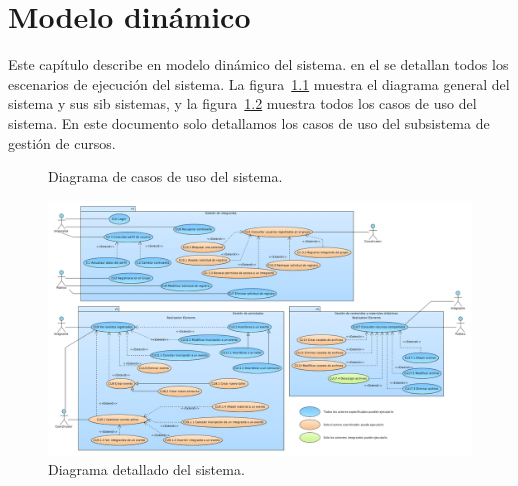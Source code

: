\chapter{Modelo dinámico}
\label{cap:modDinamico}

Este capítulo describe en modelo dinámico del sistema. en el se detallan todos los escenarios de ejecución del sistema. La figura~\ref{fig:casosDeUso} muestra el diagrama general del sistema y sus sib sistemas, y la figura~\ref{fig:casosDeUsoDetalle} muestra todos los casos de uso del sistema. En este documento solo detallamos los casos de uso del subsistema de gestión de cursos.

\begin{figure}[htbp]
	\begin{center}
		\caption{Diagrama de casos de uso del sistema.}
		\label{fig:casosDeUso}
	\end{center}
\end{figure}

\begin{figure}[htbp]
	\begin{center}
		\includegraphics[angle=90, width=.7\textwidth]{images/casosDeUsoDetalle}
		\caption{Diagrama detallado del sistema.}
		\label{fig:casosDeUsoDetalle}
	\end{center}
\end{figure}

